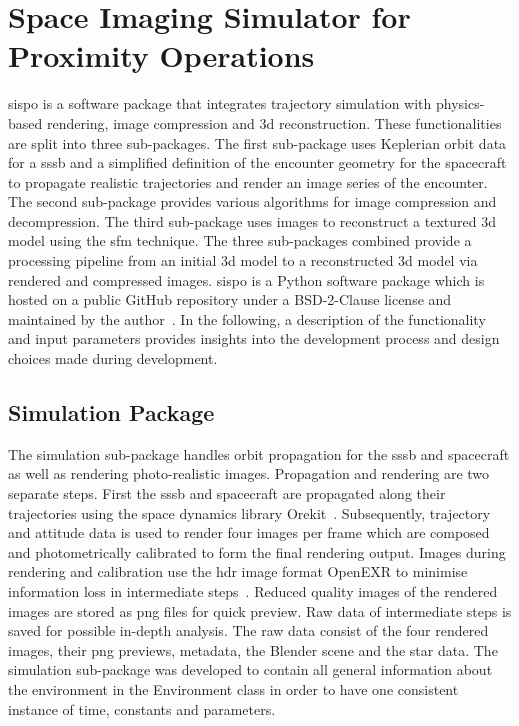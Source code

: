 \section{Space Imaging Simulator for Proximity Operations} \label{sec:sispo}
\gls{sispo} is a software package that integrates trajectory simulation with physics-based rendering, image compression and \gls{3d} reconstruction. These functionalities are split into three sub-packages. The first sub-package uses Keplerian orbit data for a \gls{sssb} and a simplified definition of the encounter geometry for the spacecraft to propagate realistic trajectories and render an image series of the encounter. The second sub-package provides various algorithms for image compression and decompression. The third sub-package uses images to reconstruct a textured \gls{3d} model using the \gls{sfm} technique. The three sub-packages combined provide a processing pipeline from an initial \gls{3d} model to a reconstructed \gls{3d} model via rendered and compressed images. \Gls{sispo} is a Python software package which is hosted on a public GitHub repository under a BSD-2-Clause license and maintained by the author~\cite{Schwarzkopf2020SpaceOperations}. In the following, a description of the functionality and input parameters provides insights into the development process and design choices made during development.

\subsection{Simulation Package}
The simulation sub-package handles orbit propagation for the \gls{sssb} and spacecraft as well as rendering photo-realistic images. Propagation and rendering are two separate steps. First the \gls{sssb} and spacecraft are propagated along their trajectories using the space dynamics library Orekit~\cite{orekit}. Subsequently, trajectory and attitude data is used to render four images per frame which are composed and photometrically calibrated to form the final rendering output. Images during rendering and calibration use the \gls{hdr} image format OpenEXR to minimise information loss in intermediate steps~\cite{openexr}. Reduced quality images of the rendered images are stored as \gls{png} files for quick preview. Raw data of intermediate steps is saved for possible in-depth analysis. The raw data consist of the four rendered images, their \gls{png} previews, metadata, the Blender scene and the star data. The simulation sub-package was developed to contain all general information about the environment in the Environment class in order to have one consistent instance of time, constants and parameters.

